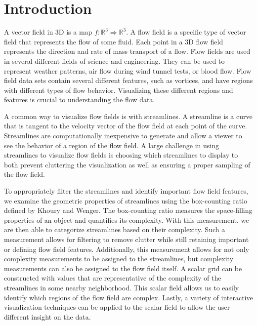 \documentclass{egpubl}
\newcommand {\emath}[1]  {\ensuremath{#1}}
\newcommand {\Real}[1]   {\emath{\mathbb{R}^{#1}}}   %
\newcommand {\Rthree}    {\Real{3}}                  %
\begin{document}

\section{Introduction}

A vector field in 3D is a map $f: \Rthree \Rightarrow \Rthree$.
A flow field is a specific type of vector field that represents the flow of some fluid.
Each point in a 3D flow field represents the direction and rate of mass transport of a flow.
Flow fields are used in several different fields of science and engineering.
They can be used to represent weather patterns, air flow during wind tunnel tests, or blood flow.
Flow field data sets contain several different features, such as vortices, and have regions with different types of flow behavior.
Visualizing these different regions and features is crucial to understanding the flow data.

A common way to visualize flow fields is with streamlines.
A streamline is a curve that is tangent to the velocity vector of the flow field at each point of the curve.
Streamlines are computationally inexpensive to generate and allow a viewer to see the behavior of a region of the flow field.
A large challenge in using streamlines to visualize flow fields is choosing which streamlines to display to both prevent cluttering the visualization as well as ensuring a proper sampling of the flow field.

To appropriately filter the streamlines and identify important flow field features, we examine the geometric properties of streamlines using the box-counting ratio defined by Khoury and Wenger.
The box-counting ratio measures the space-filling properties of an object and quantifies its complexity.
With this measurement, we are then able to categorize streamlines based on their complexity.
Such a measurement allows for filtering to remove clutter while still retaining important or defining flow field features.
Additionally, this measurement allows for not only complexity measurements to be assigned to the streamlines, but complexity measurements can also be assigned to the flow field itself.
A scalar grid can be constructed with values that are representative of the complexity of the streamlines in some nearby neighborhood.
This scalar field allows us to easily identify which regions of the flow field are complex.
Lastly, a variety of interactive visualization techniques can be applied to the scalar field to allow the user different insight on the data.
\end{document}
